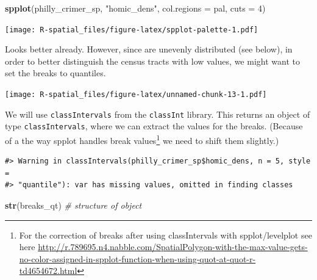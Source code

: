 \documentclass[]{book}
\newenvironment{Shaded}{\begin{snugshade}}{\end{snugshade}}
\newcommand{\KeywordTok}[1]{\textcolor[rgb]{0.13,0.29,0.53}{\textbf{#1}}}
\newcommand{\DataTypeTok}[1]{\textcolor[rgb]{0.13,0.29,0.53}{#1}}
\newcommand{\DecValTok}[1]{\textcolor[rgb]{0.00,0.00,0.81}{#1}}
\newcommand{\StringTok}[1]{\textcolor[rgb]{0.31,0.60,0.02}{#1}}
\newcommand{\CommentTok}[1]{\textcolor[rgb]{0.56,0.35,0.01}{\textit{#1}}}
\newcommand{\OperatorTok}[1]{\textcolor[rgb]{0.81,0.36,0.00}{\textbf{#1}}}
\newcommand{\NormalTok}[1]{#1}
\let\rmarkdownfootnote\footnote%
\def\footnote{\protect\rmarkdownfootnote}
\theoremstyle{definition}
\theoremstyle{definition}
\theoremstyle{definition}
\theoremstyle{remark}
\begin{document}
\begin{Shaded}
\begin{Highlighting}[]
\KeywordTok{spplot}\NormalTok{(philly_crimer_sp, }\StringTok{"homic_dens"}\NormalTok{, }\DataTypeTok{col.regions =}\NormalTok{ pal, }\DataTypeTok{cuts =} \DecValTok{4}\NormalTok{) }
\end{Highlighting}
\end{Shaded}

\texttt{[image: R-spatial\_files/figure-latex/spplot-palette-1.pdf]}

Looks better already. However, since are unevenly distributed (see
below), in order to better distinguish the census tracts with low
values, we might want to set the breaks to quantiles.

\texttt{[image: R-spatial\_files/figure-latex/unnamed-chunk-13-1.pdf]}

We will use \texttt{classIntervals} from the \texttt{classInt} library.
This returns an object of type \texttt{classIntervals}, where we can
extract the values for the breaks. (Because of a the way spplot handles
break values\footnote{For the correction of breaks after using
  classIntervals with spplot/levelplot see here
  \url{http://r.789695.n4.nabble.com/SpatialPolygon-with-the-max-value-gets-no-color-assigned-in-spplot-function-when-using-quot-at-quot-r-td4654672.html}}
we need to shift them slightly.)

\begin{Shaded}
\end{Shaded}

\begin{verbatim}
#> Warning in classIntervals(philly_crimer_sp$homic_dens, n = 5, style =
#> "quantile"): var has missing values, omitted in finding classes
\end{verbatim}

\begin{Shaded}
\begin{Highlighting}[]
\KeywordTok{str}\NormalTok{(breaks_qt)  }\CommentTok{# structure of object}
\end{Highlighting}
\end{Shaded}
\end{document}

